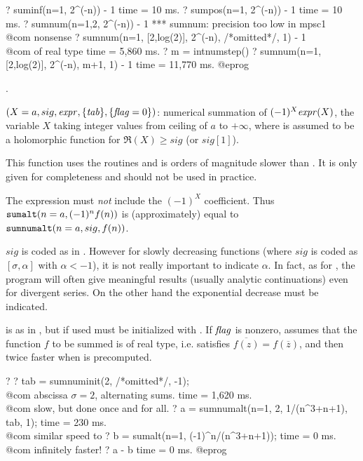 \bprog
? suminf(n=1, 2^(-n)) - 1
time = 10 ms.
? sumpos(n=1, 2^(-n)) - 1
time = 10 ms.
? sumnum(n=1,2, 2^(-n)) - 1
   *** sumnum: precision too low in mpsc1 \\@com nonsense
? sumnum(n=1, [2,log(2)], 2^(-n), /*omitted*/, 1) - 1 \\@com of real type
time = 5,860 ms.
? m = intnumstep()
? sumnum(n=1,[2,log(2)], 2^(-n), m+1, 1) - 1
time = 11,770 ms.
@eprog

.

$(X=a,sig,\hbox{\it expr\/},\{\hbox{\it tab\/}\},\{\hbox{\it f\kern0pt lag\/}=0\})$: numerical
summation of $(-1)^X\hbox{\it expr\/}(X)$, the variable $X$ taking integer values from
ceiling of $a$ to $+\infty$, where  is assumed to be a holomorphic
function for $\Re(X)\ge sig$ (or $sig[1]$).

 This function uses the  routines and is
orders of magnitude slower than . It is only given for
completeness and should not be used in practice.

 The expression  must \emph{not} include the
$(-1)^X$ coefficient. Thus ${\tt sumalt}(n=a,(-1)^nf(n))$ is (approximately)
equal to ${\tt sumnumalt}(n=a,sig,f(n))$.

$sig$ is coded as in . However for slowly decreasing functions
(where $sig$ is coded as $[\sigma,\alpha]$ with $\alpha<-1$), it is not
really important to indicate $\alpha$. In fact, as for , the
program will often give meaningful results (usually analytic continuations)
even for divergent series. On the other hand the exponential decrease must be
indicated.

 is as in , but if used must be initialized with
. If $\hbox{\it f\kern0pt lag\/}$ is nonzero, assumes that the function $f$ to be
summed is of real type, i.e. satisfies $\overline{f(z)}=f(\overline{z})$, and
then twice faster when  is precomputed.

\bprog
? 
? tab = sumnuminit(2, /*omitted*/, -1); \\@com abscissa $\sigma=2$, alternating sums.
time = 1,620 ms. \\@com slow, but done once and for all.
? a = sumnumalt(n=1, 2, 1/(n^3+n+1), tab, 1);
time = 230 ms. \\@com similar speed to 
? b = sumalt(n=1, (-1)^n/(n^3+n+1));
time = 0 ms. \\@com infinitely faster!
? a - b
time = 0 ms.
@eprog

